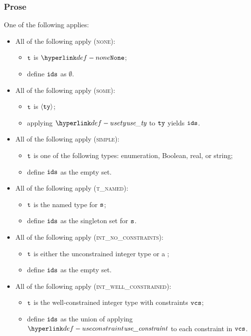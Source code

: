 \subsubsection{Prose}
One of the following applies:
\begin{itemize}
  \item All of the following apply (\textsc{none}):
  \begin{itemize}
    \item $\texttt{t}$ is $\None$;
    \item define $\texttt{ids}$ as $\emptyset$.
  \end{itemize}

  \item All of the following apply (\textsc{some}):
  \begin{itemize}
    \item $\texttt{t}$ is $\langle\texttt{ty}\rangle$;
    \item applying $\usety$ to $\texttt{ty}$ yields $\texttt{ids}$.
  \end{itemize}

  \item All of the following apply (\textsc{simple}):
  \begin{itemize}
    \item $\texttt{t}$ is one of the following types: enumeration, Boolean, real, or string;
    \item define $\texttt{ids}$ as the empty set.
  \end{itemize}

  \item All of the following apply (\textsc{t\_named}):
  \begin{itemize}
    \item $\texttt{t}$ is the named type for $\texttt{s}$;
    \item define $\texttt{ids}$ as the singleton set for $\texttt{s}$.
  \end{itemize}

  \item All of the following apply (\textsc{int\_no\_constraints}):
  \begin{itemize}
    \item $\texttt{t}$ is either the unconstrained integer type or a \parameterizedintegertype;
    \item define $\texttt{ids}$ as the empty set.
  \end{itemize}

  \item All of the following apply (\textsc{int\_well\_constrained}):
  \begin{itemize}
    \item $\texttt{t}$ is the well-constrained integer type with constraints $\texttt{vcs}$;
    \item define $\texttt{ids}$ as the union of applying $\useconstraint$ to each constraint in $\texttt{vcs}$.
  \end{itemize}


\end{itemize}
